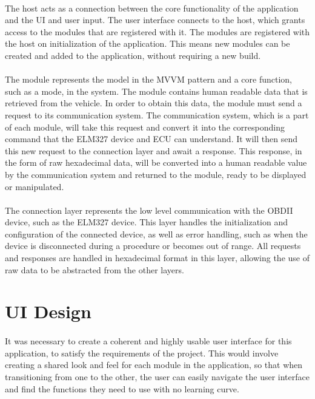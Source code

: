 	\paragraph{}{
	The host acts as a connection between the core functionality of the application and the UI and user input. The user interface connects to the host, which grants access to the modules that are registered with it. The modules are registered with the host on initialization of the application. This means new modules can be created and added to the application, without requiring a new build.
	}
	\paragraph{}{
	The module represents the model in the MVVM pattern and a core function, such as a mode, in the system. The module contains human readable data that is retrieved from the vehicle. In order to obtain this data, the module must send a request to its communication system. The communication system, which is a part of each module, will take this request and convert it into the corresponding command that the ELM327 device and ECU can understand. It will then send this new request to the connection layer and await a response. This response, in the form of raw hexadecimal data, will be converted into a human readable value by the communication system and returned to the module, ready to be displayed or manipulated.
	}
	\paragraph{}{
	The connection layer represents the low level communication with the OBDII device, such as the ELM327 device. This layer handles the initialization and configuration of the connected device, as well as error handling, such as when the device is disconnected during a procedure or becomes out of range. All requests and responses are handled in hexadecimal format in this layer, allowing the use of raw data to be abstracted from the other layers. 
	}

\section{UI Design}
	\paragraph{}{
	It was necessary to create a coherent and highly usable user interface for this application, to satisfy the requirements of the project. This would involve creating a shared look and feel for each module in the application, so that when transitioning from one to the other, the user can easily navigate the user interface and find the functions they need to use with no learning curve.
	}	
